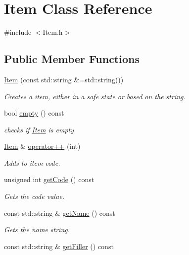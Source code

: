 \hypertarget{class_item}{}\section{Item Class Reference}
\label{class_item}


{\ttfamily \#include $<$Item.\+h$>$}

\subsection*{Public Member Functions}
\begin{DoxyCompactItemize}
\item 
\mbox{\hyperlink{class_item_a878f8ff05023bb47d42bf2c2a98da323}{Item}} (const std\+::string \&=std\+::string())
\begin{DoxyCompactList}\small\item\em Creates a item, either in a safe state or based on the string. \end{DoxyCompactList}\item 
bool \mbox{\hyperlink{class_item_a8a1745ce42e5695d5c63c62bd5be7d8e}{empty}} () const
\begin{DoxyCompactList}\small\item\em checks if \mbox{\hyperlink{class_item}{Item}} is empty \end{DoxyCompactList}\item 
\mbox{\hyperlink{class_item}{Item}} \& \mbox{\hyperlink{class_item_a818f9273ed8889c8b27cb97d2c292e77}{operator++}} (int)
\begin{DoxyCompactList}\small\item\em Adds to item code. \end{DoxyCompactList}\item 
unsigned int \mbox{\hyperlink{class_item_a359a6949cfad6cfb7f7d85e132525056}{get\+Code}} () const
\begin{DoxyCompactList}\small\item\em Gets the code value. \end{DoxyCompactList}\item 
const std\+::string \& \mbox{\hyperlink{class_item_a906722df9ab3f424d32c4106ff64aa15}{get\+Name}} () const
\begin{DoxyCompactList}\small\item\em Gets the name string. \end{DoxyCompactList}\item 
const std\+::string \& \mbox{\hyperlink{class_item_a67903e1bcdd09d0857295a33b5fbeb6b}{get\+Filler}} () const

\end{DoxyCompactItemize}
